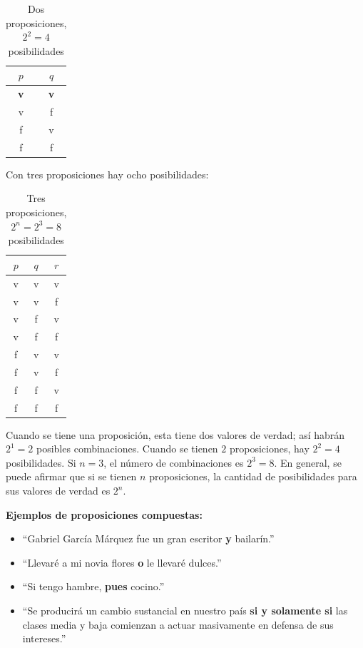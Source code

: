 \begin{table}[ht]
\caption{Dos proposiciones, $2^2=4$ posibilidades}\label{tabla:dosalados}
\centering
\begin{tabular}{|c|c|}
\hline
$p$ & $q$  \\ \hline
\textbf{v}   & \textbf{v}   \\ \hline
v   & f   \\ \hline
f   & v   \\ \hline
f   & f   \\ \hline
\end{tabular}
\end{table}

Con tres proposiciones hay ocho posibilidades:

\begin{table}[ht]
\caption{Tres proposiciones, $2^n=2^3=8$ posibilidades}\label{tabla:dosalatres}
\centering
\begin{tabular}{|c|c|c|}
\hline
$p$ & $q$ & $r$ \\ \hline
v   & v   & v \\ \hline
v   & v   & f \\ \hline
v   & f   & v \\ \hline
v   & f   & f \\ \hline
f   & v   & v \\ \hline
f   & v   & f \\ \hline
f   & f   & v \\ \hline
f   & f   & f \\ \hline
\end{tabular}
\end{table}

Cuando se tiene una proposición, esta tiene dos valores de verdad; así habrán $2^1=2$ posibles combinaciones. Cuando se tienen $2$ proposiciones, hay $2^2=4$ posibilidades. Si $n=3$, el número de combinaciones es $2^3=8$. En general, se puede afirmar que si se tienen $n$ proposiciones, la cantidad de posibilidades para sus valores de verdad es $2^n$.

\noindent \textbf{Ejemplos de proposiciones compuestas:}
\begin{itemize}
    \item ``Gabriel García Márquez fue un gran escritor \textbf{y} bailarín.''
    \item ``Llevaré a mi novia flores \textbf{o} le llevaré dulces.''
    \item ``Si tengo hambre, \textbf{pues} cocino.''
    \item ``Se producirá un cambio sustancial en nuestro país \textbf{si y solamente si} las clases media y baja comienzan a actuar masivamente en defensa de sus intereses.''
\end{itemize}

